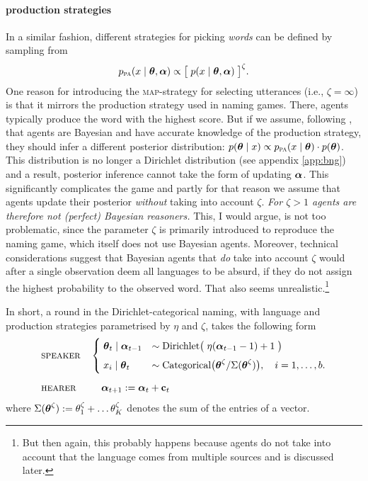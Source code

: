 \documentclass{../src/bcthesispart}
\begin{document}
\paragraph{production strategies}

In a similar fashion, different strategies for picking \emph{words} can be defined by sampling from
\begin{equation}
	p_{\textsc{pa}}(x \mid \boldsymbol{\mathbf{\theta}}, \boldsymbol{\mathbf{\alpha}}) 
		\propto \bigl[\; p(x \mid \boldsymbol{\mathbf{\theta}}, \boldsymbol{\mathbf{\alpha}}) \;\bigr]^\zeta.
\end{equation}
One reason for introducing the \textsc{map}-strategy for selecting utterances (i.e., $\zeta = \infty$) is that it mirrors the production strategy used in naming games.
There, agents typically produce the word with the highest score.
But if we assume, following \textcite{Griffiths2007a}, that agents are Bayesian and have accurate knowledge of the production strategy, they should infer a different posterior distribution: $p(\boldsymbol{\mathbf{\theta}} \mid x) \propto p_{\textsc{pa}}(x \mid \boldsymbol{\mathbf{\theta}}) \cdot p(\boldsymbol{\mathbf{\theta}})$.
This distribution is no longer a Dirichlet distribution (see appendix \ref{app:bng}) and a result, posterior inference cannot take the form of updating $\boldsymbol{\mathbf{\alpha}}$.
This significantly complicates the game and partly for that reason we assume that agents update their posterior \emph{without} taking into account $\zeta$.
\emph{For $\zeta > 1$ agents are therefore not (perfect) Bayesian reasoners.}
This, I would argue, is not too problematic, since the parameter $\zeta$ is primarily introduced to reproduce the naming game, which itself does not use Bayesian agents. 
Moreover, technical considerations suggest that Bayesian agents that \emph{do} take into account $\zeta$ would after a single observation deem all  languages to be absurd, if they do not assign the highest probability to the observed word. That also seems unrealistic.\footnote{%
	But then again, this probably happens because agents do not take into account that the language comes from multiple sources \parencite[cf][]{Ferdinand2009,Smith2009} and is discussed later.
	}



In short, a round in the Dirichlet-categorical naming, with language and production strategies parametrised by $\eta$ and $\zeta$, takes the following form
\begin{align}
	&\textsc{speaker} 
	\quad
	\begin{cases} 
		\;\boldsymbol{\mathbf{\theta}}_t \mid \boldsymbol{\mathbf{\alpha}}_{t-1}
			&\sim \text{Dirichlet}\bigl(\;\eta(\boldsymbol{\mathbf{\alpha}}_{t-1} - 1) + 1\;\bigr)
			\\[.5em]
		\;x_i \mid \boldsymbol{\mathbf{\theta}}_t
			&\sim \text{Categorical}\bigl( \boldsymbol{\mathbf{\theta}}^\zeta / \Sigma(\boldsymbol{\mathbf{\theta}}^\zeta) \bigr), \quad i = 1, \dots, b.	
	\end{cases}
	\\[.5em]
	&\textsc{hearer} 
	\qquad \;\;
	\boldsymbol{\mathbf{\alpha}}_{t+1} 
			:= \boldsymbol{\mathbf{\alpha}}_t + \boldsymbol{\mathbf{c}}_t
\end{align}
where $\Sigma(\boldsymbol{\mathbf{\boldsymbol{\mathbf{\theta}}}}^\zeta) := \theta_1^\zeta + \dots \theta_K^\zeta$ denotes the sum of the entries of a vector.
\end{document}
